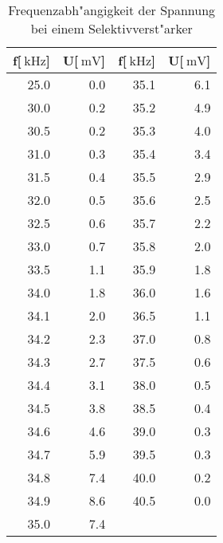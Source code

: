 \begin{table}[!h]
\begin{center}
\begin{tabular}{|r|r|r|r|}
\hline
f[$\SI{}{\kilo\hertz}$] & U[$\SI{}{\milli\volt}$] & f[$\SI{}{\kilo\hertz}$] & U[$\SI{}{\milli\volt}$]\\
\hline
\hline
25.0 &	0.0 &	35.1 &	6.1 \\	
30.0 &	0.2 &	35.2 &	4.9 \\	
30.5 &	0.2 &	35.3 &	4.0 \\	
31.0 &	0.3 &	35.4 &	3.4 \\	
31.5 &	0.4 &	35.5 &	2.9 \\	
32.0 &	0.5 &	35.6 &	2.5 \\	
32.5 &	0.6 &	35.7 &	2.2 \\	
33.0 &	0.7 &	35.8 &	2.0 \\	
33.5 &	1.1 &	35.9 &	1.8 \\	
34.0 &	1.8 &	36.0 &	1.6 \\	
34.1 &	2.0 &	36.5 &	1.1 \\	
34.2 &	2.3 &	37.0 &	0.8 \\	
34.3 &	2.7 &	37.5 &	0.6 \\	
34.4 &	3.1 &	38.0 &	0.5 \\	
34.5 &	3.8 &	38.5 &	0.4 \\	
34.6 &	4.6 &	39.0 &	0.3 \\	
34.7 &	5.9 &	39.5 &	0.3 \\	
34.8 &	7.4 &	40.0 &	0.2 \\	
34.9 &	8.6 &	40.5 &	0.0 \\	
35.0 &	7.4 &  & \\
\hline
\end{tabular}
\caption[Messwerte zu Aufgabenteil a]{Frequenzabh"angigkeit der Spannung bei einem Selektivverst"arker}
\label{tabelle:aufgabe_a}
\end{center}
\end{table}